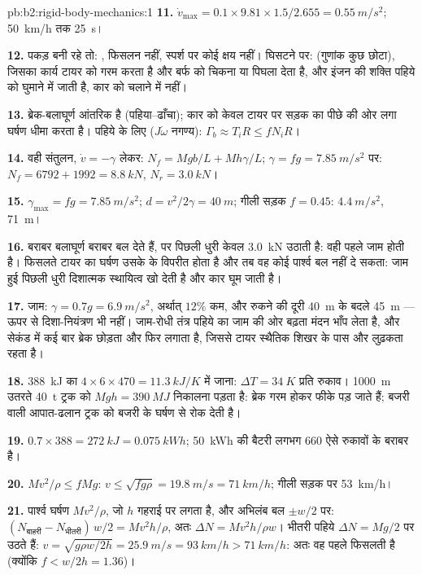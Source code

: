 \begin{solution}{pb:b2:rigid-body-mechanics:1}
\textbf{11.} $\dot v_{\max} = 0.1 \times 9.81 \times 1.5/2.655 = \qty{0.55}{m/s^2}$;
\qty{50}{km/h} तक \qty{25}{s}।

\textbf{12.} पकड़ बनी रहे तो: , फिसलन नहीं, स्पर्श पर कोई
क्षय नहीं। घिसटने पर:  (गुणांक कुछ छोटा),
जिसका कार्य टायर को गरम करता है और बर्फ को चिकना या पिघला देता है, और इंजन की
शक्ति पहिये को घुमाने में जाती है, कार को चलाने में नहीं।

\textbf{13.} ब्रेक-बलाघूर्ण आंतरिक है (पहिया--ढाँचा); कार को
केवल टायर पर सड़क का पीछे की ओर लगा घर्षण धीमा करता है। पहिये के लिए
($J\dot\omega$ नगण्य): $\Gamma_b \approx T_iR \le fN_iR$।

\textbf{14.} वही संतुलन, $\dot v = -\gamma$ लेकर: $N_f = Mgb/L + Mh\gamma/L$;
$\gamma = fg = \qty{7.85}{m/s^2}$ पर: $N_f = 6792 + 1992 = \qty{8.8}{kN}$,
$N_r =
\qty{3.0}{kN}$।

\textbf{15.} $\gamma_{\max} = fg = \qty{7.85}{m/s^2}$;
$d = v^2/2\gamma = \qty{40}{m}$;
गीली सड़क $f = 0.45$: $\qty{4.4}{m/s^2}$, \qty{71}{m}।

\textbf{16.} बराबर बलाघूर्ण बराबर बल देते हैं, पर पिछली धुरी केवल
\qty{3.0}{kN} उठाती है: वही पहले जाम होती है। फिसलते टायर का घर्षण उसके
 के विपरीत होता है और तब वह कोई पार्श्व बल नहीं दे सकता: जाम हुई
पिछली धुरी दिशात्मक स्थायित्व खो देती है और कार घूम जाती है।

\textbf{17.} जाम: $\gamma = 0.7g = \qty{6.9}{m/s^2}$, अर्थात् $12\%$ कम, और रुकने की
दूरी \qty{40}{m} के बदले \qty{45}{m} --- ऊपर से दिशा-नियंत्रण भी नहीं। जाम-रोधी
तंत्र पहिये का जाम की ओर बढ़ता मंदन भाँप लेता है, और सेकंड में कई बार ब्रेक
छोड़ता और फिर लगाता है, जिससे टायर स्थैतिक शिखर के पास और लुढ़कता रहता है।

\textbf{18.} \qty{388}{kJ} का $4 \times 6 \times 470 = \qty{11.3}{kJ/K}$ में
जाना: $\Delta T =
\qty{34}{K}$ प्रति रुकाव। \qty{1000}{m} उतरते \qty{40}{t}
ट्रक को
$Mgh = \qty{390}{MJ}$ निकालना पड़ता है: ब्रेक गरम होकर फीके पड़ जाते हैं; बजरी
वाली आपात-ढलान ट्रक को बजरी के घर्षण से रोक देती है।

\textbf{19.} $0.7 \times 388 = \qty{272}{kJ} = \qty{0.075}{kWh}$; \qty{50}{kWh} की
बैटरी लगभग $660$ ऐसे रुकावों के बराबर है।

\textbf{20.} $Mv^2/\rho \le fMg$:
$v \le \sqrt{fg\rho} = \qty{19.8}{m/s} =
\qty{71}{km/h}$; गीली सड़क पर
\qty{53}{km/h}।

\textbf{21.} पार्श्व घर्षण $Mv^2/\rho$, जो $h$ गहराई पर लगता है, और अभिलंब बल
$\pm w/2$ पर: $(N_{\text{बाहरी}} - N_{\text{भीतरी}})\,w/2 = Mv^2h/\rho$, अतः
$\Delta N =
Mv^2h/\rho w$। भीतरी पहिये $\Delta N = Mg/2$ पर उठते हैं:
$v = \sqrt{g\rho w/2h} =
\qty{25.9}{m/s} = \qty{93}{km/h} > \qty{71}{km/h}$:
अतः वह पहले फिसलती है (क्योंकि $f <
w/2h = 1.36$)।


\end{solution}
